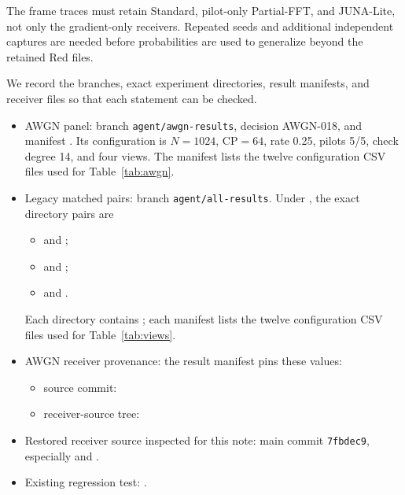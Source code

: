 \documentclass[11pt]{article}
\begin{document}
The frame traces must retain Standard, pilot-only Partial-FFT, and JUNA-Lite,
not only the gradient-only receivers.  Repeated seeds and additional
independent captures are needed before probabilities are used to generalize
beyond the retained Red files.

We record the branches, exact experiment directories, result manifests, and
receiver files so that each statement can be checked.

\begingroup
\small
\begin{itemize}[itemsep=0.15em,topsep=0.2em]
  \item AWGN panel: branch \texttt{agent/awgn-results}, decision AWGN-018,
  and manifest
  .
  Its configuration is $N=1024$, CP$=64$, rate 0.25, pilots 5/5, check
  degree 14, and four views.  The manifest lists the twelve configuration
  CSV files used for Table~\ref{tab:awgn}.
  \item Legacy matched pairs: branch \texttt{agent/all-results}.  Under
  , the exact directory pairs are
  \begin{itemize}
    \item {}
    and ;
    \item {}
    and ;
    \item {}
    and .
  \end{itemize}
  Each directory contains ; each manifest
  lists the twelve configuration CSV files used for Table~\ref{tab:views}.
  \item AWGN receiver provenance: the result manifest pins these values:
  \begin{itemize}
    \item source commit:\\
    \item receiver-source tree:\\
  \end{itemize}
  \item Restored receiver source inspected for this note: main commit
  \texttt{7fbdec9}, especially
   and
  .
  \item Existing regression test:
  .
\end{itemize}
\endgroup
\end{document}
